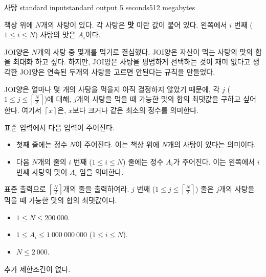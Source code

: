\begin{problem}{사탕}
	{standard input}{standard output}
	{5 seconds}{512 megabytes}{}
	
	책상 위에 $N$개의 사탕이 있다. 각 사탕은 \textbf{맛} 이란 값이 붙어 있다. 왼쪽에서 $i$ 번째 ($1 \le i \le N$) 사탕의 맛은 $A_i$이다.
	
	JOI양은 $N$개의 사탕 중 몇개를 먹기로 결심했다. JOI양은 자신이 먹는 사탕의 맛의 합을 최대화 하고 싶다. 하지만, JOI양은 사탕을 평범하게 선택하는 것이 재미 없다고 생각한 JOI양은 연속된 두개의 사탕을 고르면 안된다는 규칙을 만들었다.
	
	JOI양은 얼마나 몇 개의 사탕을 먹을지 아직 결정하지 않았기 때문에, 각 $j$ ($1 \le j \le \left\lceil \frac{N}{2} \right\rceil$)에 대해, $j$개의 사탕을 먹을 때 가능한 맛의 합의 최댓값을 구하고 싶어한다. 여기서 $\left\lceil x \right\rceil$은, $x$보다 크거나 같은 최소의 정수를 의미한다.
	
	\InputFile
	
	표준 입력에서 다음 입력이 주어진다.
	
	\begin{itemize}
		\item 첫째 줄에는 정수 $N$이 주어진다. 이는 책상 위에 $N$개의 사탕이 있다는 의미이다.
		\item 다음 $N$개의 줄의 $i$ 번째 ($1 \le i \le N$) 줄에는 정수 $A_i$가 주어진다. 이는 왼쪽에서 $i$ 번째 사탕의 맛이 $A_i$ 임을 의미한다.
	\end{itemize}
		
	\OutputFile
	
	표준 출력으로 $\left\lceil \frac{N}{2} \right\rceil$개의 줄을 출력하여라. $j$ 번째 ($1 \le j \le \left\lceil \frac{N}{2} \right\rceil$) 줄은 $j$개의 사탕을 먹을 때 가능한 맛의 합의 최댓값이다.
		
	\Constraints
	
	\begin{itemize}
		\item $1 \le N \le 200\ 000$.
		\item $1 \le A_i \le 1\ 000\ 000\ 000$ ($1 \le i \le N$).
	\end{itemize}
	
	
	\begin{itemize}
		\item $N \le 2\ 000$.
	\end{itemize}

	추가 제한조건이 없다.
	
	\Examples
	
	\begin{example}
	\end{example}
	

\end{problem}
